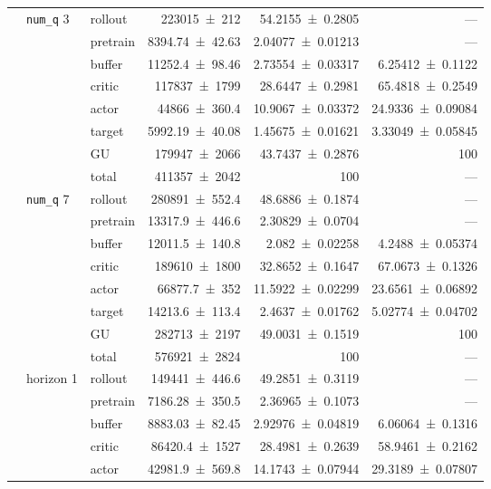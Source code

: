 {\begin{longtable}{@{}lllrrr@{}}
     & \texttt{num\_\allowbreak q} 3 & rollout & \num{223015+-212} & \num{54.2155+-0.2805} & --- \\
     &  & pretrain & \num{8394.74+-42.63} & \num{2.04077+-0.01213} & --- \\
     &  & buffer & \num{11252.4+-98.46} & \num{2.73554+-0.03317} & \num{6.25412+-0.1122} \\
     &  & critic & \num{117837+-1799} & \num{28.6447+-0.2981} & \num{65.4818+-0.2549} \\
     &  & actor & \num{44866+-360.4} & \num{10.9067+-0.03372} & \num{24.9336+-0.09084} \\
     &  & target & \num{5992.19+-40.08} & \num{1.45675+-0.01621} & \num{3.33049+-0.05845} \\
     &  & GU & \num{179947+-2066} & \num{43.7437+-0.2876} & 100 \\
     &  & total & \num{411357+-2042} & \num{100} & --- \\
    \addlinespace[2pt]
     & \texttt{num\_\allowbreak q} 7 & rollout & \num{280891+-552.4} & \num{48.6886+-0.1874} & --- \\
     &  & pretrain & \num{13317.9+-446.6} & \num{2.30829+-0.0704} & --- \\
     &  & buffer & \num{12011.5+-140.8} & \num{2.082+-0.02258} & \num{4.2488+-0.05374} \\
     &  & critic & \num{189610+-1800} & \num{32.8652+-0.1647} & \num{67.0673+-0.1326} \\
     &  & actor & \num{66877.7+-352} & \num{11.5922+-0.02299} & \num{23.6561+-0.06892} \\
     &  & target & \num{14213.6+-113.4} & \num{2.4637+-0.01762} & \num{5.02774+-0.04702} \\
     &  & GU & \num{282713+-2197} & \num{49.0031+-0.1519} & 100 \\
     &  & total & \num{576921+-2824} & \num{100} & --- \\
    \addlinespace[2pt]
     & horizon 1 & rollout & \num{149441+-446.6} & \num{49.2851+-0.3119} & --- \\
     &  & pretrain & \num{7186.28+-350.5} & \num{2.36965+-0.1073} & --- \\
     &  & buffer & \num{8883.03+-82.45} & \num{2.92976+-0.04819} & \num{6.06064+-0.1316} \\
     &  & critic & \num{86420.4+-1527} & \num{28.4981+-0.2639} & \num{58.9461+-0.2162} \\
     &  & actor & \num{42981.9+-569.8} & \num{14.1743+-0.07944} & \num{29.3189+-0.07807} \\

\end{longtable}}
